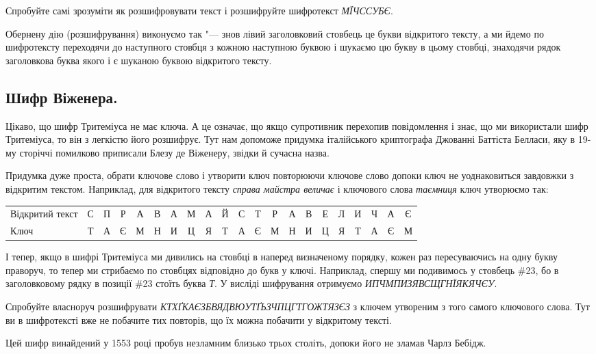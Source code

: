 \documentclass{book}
\begin{document}
{Спробуйте самі зрозуміти як розшифровувати текст і розшифруйте шифротекст
\emph{МЇЧССУБЄ}.

Обернену дію (розшифрування) виконуємо так "--- знов лівий заголовковий стовбець
це букви відкритого тексту, а ми йдемо по шифротексту переходячи до наступного
стовбця з кожною наступною буквою і шукаємо цю букву в цьому стовбці, знаходячи
рядок заголовкова буква якого і є шуканою буквою відкритого тексту.

\subsection*{Шифр Віженера.}

Цікаво, що шифр Тритеміуса не має ключа. А це означає, що якщо супротивник перехопив
повідомлення і знає, що ми використали шифр Тритеміуса, то він з легкістю його
розшифрує. Тут нам допоможе придумка італійського криптографа Джованні Баттіста
Белласи, яку в 19-му сторіччі помилково приписали Блезу де Віженеру, звідки й
сучасна назва.

Придумка дуже проста, обрати ключове слово і утворити ключ повторюючи
ключове слово допоки ключ не уоднаковиться завдовжки з відкритим
текстом. Наприклад, для відкритого тексту \emph{справа майстра величає} і
ключового слова \emph{таємниця} ключ утворюємо так:

\noindent
	\setlength\tabcolsep{0.5pt}
	\begin{tabular}{ lcccccccccccccccccccc }
		Відкритий текст&С&П&Р&А&В&А&М&А&Й&С&Т&Р&А&В&Е&Л&И&Ч&А&Є \\
		Ключ&Т&А&Є&М&Н&И&Ц&Я&Т&А&Є&М&Н&И&Ц&Я&Т&А&Є&М \\
	\end{tabular}
	\setlength\tabcolsep{6pt}

І тепер, якщо в шифрі Тритеміуса ми дивились на стовбці в наперед визначеному
порядку, кожен раз пересуваючись на одну букву праворуч, то тепер ми стрибаємо
по стовбцях відповідно до букв у ключі. Наприклад, спершу ми подивимось у
стовбець \#23, бо в заголовковому рядку в позиції \#23 стоїть буква \emph{Т}.
У висліді шифрування отримуємо \emph{ИПЧМПИЗЯВСЩГНЇЯКЯЧЄУ}.

Спробуйте власноруч розшифрувати \emph{КТХҐКАЄЗБВЯДВЮУТҐЬЗЧПЦГТГОЖТЯЗЄЗ} з
ключем утвореним з того самого ключового слова. Тут ви в шифротексті вже не
побачите тих повторів, що їх можна побачити у відкритому тексті.

Цей шифр винайдений у 1553 році пробув незламним близько трьох століть, допоки
його не зламав Чарлз Бебідж.

}
\end{document}
